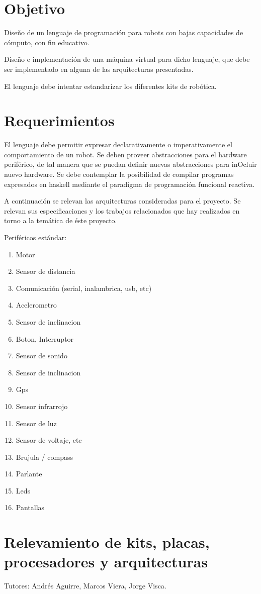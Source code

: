 

\section{Objetivo}

Diseño de un lenguaje de programación para robots con bajas capacidades de cómputo, con fin educativo.

Diseño e implementación de una máquina virtual para dicho lenguaje, que debe ser implementado en alguna de las
arquitecturas presentadas.

El lenguaje debe intentar estandarizar los diferentes kits de robótica.

\section{Requerimientos}

El lenguaje debe permitir expresar declarativamente o imperativamente el comportamiento de un robot.
Se deben proveer abstracciones para el hardware periférico, de tal manera que se puedan definir nuevas abstracciones para inOcluir nuevo hardware.
Se debe contemplar la posibilidad de compilar programas expresados en haskell mediante el paradigma de programación funcional reactiva.

A continuación se relevan las arquitecturas consideradas para el proyecto. Se relevan sus especificaciones y los trabajos relacionados que hay realizados en torno a la temática de éste proyecto.

Periféricos estándar:

\begin {enumerate}
  \item Motor
  \item Sensor de distancia
  \item Comunicación (serial, inalambrica, usb, etc)
  \item Acelerometro
  \item Sensor de inclinacion
  \item Boton, Interruptor
  \item Sensor de sonido
  \item Sensor de inclinacion
  \item Gps
  \item Sensor infrarrojo
  \item Sensor de luz
  \item Sensor de voltaje, etc
  \item Brujula / compass
  \item Parlante
  \item Leds
  \item Pantallas
\end {enumerate}


\section{Relevamiento de kits, placas, procesadores y arquitecturas}

\author{Guillermo Pacheco}

Tutores: Andrés Aguirre, Marcos Viera, Jorge Visca.

